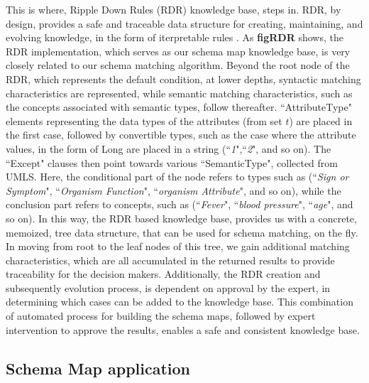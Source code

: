 This is where, Ripple Down Rules (RDR) knowledge base, steps in. RDR, by design, provides a safe and traceable data structure for creating, maintaining, and evolving knowledge, in the form of iterpretable rules \cite{compton1992ripple, richards2009two, kim2018rdr}. As \textbf{figRDR} shows, the RDR implementation, which serves as our schema map knowledge base, is very closely related to our schema matching algorithm. Beyond the root node of the RDR, which represents the default condition, at lower depths, syntactic matching characteristics are represented, while semantic matching characteristics, such as the concepts associated with semantic types, follow thereafter. ``AttributeType" elements representing the data types of the attributes (from set $t$) are placed in the first case, followed by convertible types, such as the case where the attribute values, in the form of Long are placed in a string (``\textit{1}",``\textit{2}", and so on). The ``Except" clauses then point towards various ``SemanticType", collected from UMLS. Here, the conditional part of the node refers to types such as (``\textit{Sign or Symptom}", ``\textit{Organism Function}", ``\textit{organism Attribute}", and so on), while the conclusion part refers to concepts, such as (``\textit{Fever}", ``\textit{blood pressure}", ``\textit{age}", and so on). In this way, the RDR based knowledge base, provides us with a concrete, memoized, tree data structure, that can be used for schema matching, on the fly. In moving from root to the leaf nodes of this tree, we gain additional matching characteristics, which are all accumulated in the returned results to provide traceability for the decision makers. Additionally, the RDR creation and subsequently evolution process, is dependent on approval by the expert, in determining which cases can be added to the knowledge base. This combination of automated process for building the schema maps, followed by expert intervention to approve the results, enables a safe and consistent knowledge base. 

\subsection*{Schema Map application}
\label{schema_map_evol}

